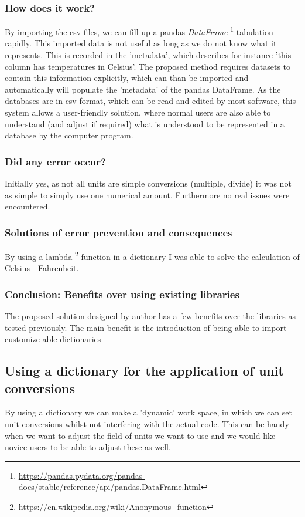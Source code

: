 \documentclass[sigchi, nonacm]{acmart}
\begin{document}
\subsubsection{How does it work?}
By importing the csv files, we can fill up a pandas \textit{DataFrame} \footnote{\raggedright{\url{https://pandas.pydata.org/pandas-docs/stable/reference/api/pandas.DataFrame.html}}}
tabulation rapidly. This imported data is not useful as long as we do not know what it represents. This is recorded in the 'metadata', which describes for instance 'this column has temperatures in Celsius'. The proposed method requires datasets to contain this information explicitly, which can than be imported and automatically will populate the 'metadata' of the pandas DataFrame.
As the databases are in csv format, which can be read and edited by most software, this system allows a user-friendly solution, where normal users are also able to understand (and adjust if required) what is understood to be represented in a database by the computer program.

\subsubsection{Did any error occur?}
Initially yes, as not all units are simple conversions (multiple, divide) it was not as simple to simply use one numerical amount. Furthermore no real issues were encountered.

\subsubsection{Solutions of error prevention and consequences}
By using a lambda \footnote{\raggedright{\url{https://en.wikipedia.org/wiki/Anonymous_function}}} function in a dictionary I was able to solve the calculation of Celsius - Fahrenheit.

\subsubsection{Conclusion: Benefits over using existing libraries}
The proposed solution designed by author has a few benefits over the libraries as tested previously. The main benefit is the introduction of being able to import customize-able dictionaries



\subsection{Using a dictionary for the application of unit conversions}
By using a dictionary we can make a 'dynamic' work space, in which we can set unit conversions whilst not interfering with the actual code. This can be handy when we want to adjust the field of units we want to use and we would like novice users to be able to adjust these as well.
\end{document}
